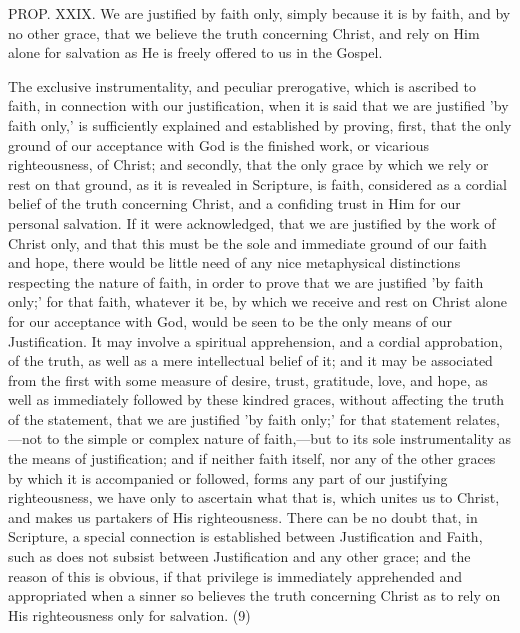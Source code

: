 \documentclass[
]{book}
\begin{document}
PROP. XXIX. We are justified by faith only, simply because it is by faith, and by no other grace, that we believe the truth concerning Christ, and rely on Him alone for salvation as He is freely offered to us in the Gospel.

The exclusive instrumentality, and peculiar prerogative, which is ascribed to faith, in connection with our justification, when it is said that we are justified 'by faith only,' is sufficiently explained and established by proving, first, that the only ground of our acceptance with God is the finished work, or vicarious righteousness, of Christ; and secondly, that the only grace by which we rely or rest on that ground, as it is revealed in Scripture, is faith, considered as a cordial belief of the truth concerning Christ, and a confiding trust in Him for our personal salvation. If it were acknowledged, that we are justified by the work of Christ only, and that this must be the sole and immediate ground of our faith and hope, there would be little need of any nice metaphysical distinctions respecting the nature of faith, in order to prove that we are justified 'by faith only;' for that faith, whatever it be, by which we receive and rest on Christ alone for our acceptance with God, would be seen to be the only means of our Justification. It may involve a spiritual apprehension, and a cordial approbation, of the truth, as well as a mere intellectual belief of it; and it may be associated from the first with some measure of desire, trust, gratitude, love, and hope, as well as immediately followed by these kindred graces, without affecting the truth of the statement, that we are justified 'by faith only;' for that statement relates,---not to the simple or complex nature of faith,---but to its sole instrumentality as the means of justification; and if neither faith itself, nor any of the other graces by which it is accompanied or followed, forms any part of our justifying righteousness, we have only to ascertain what that is, which unites us to Christ, and makes us partakers of His righteousness. There can be no doubt that, in Scripture, a special connection is established between Justification and Faith, such as does not subsist between Justification and any other grace; and the reason of this is obvious, if that privilege is immediately apprehended and appropriated when a sinner so believes the truth concerning Christ as to rely on His righteousness only for salvation. (9)
\end{document}

